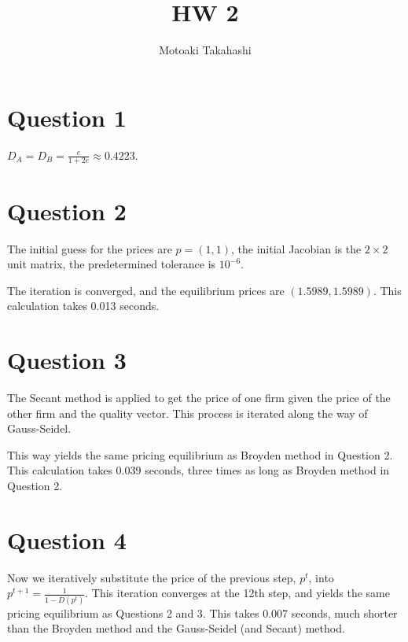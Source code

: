 \documentclass[12pt]{article}
\begin{document}
 
 
\title{HW 2}
\author{Motoaki Takahashi}
\maketitle
\section{Question 1}
$D_{A}=D_{B}=\frac{e}{1+2e}\approx0.4223.$

\section{Question 2}
The initial guess for the prices are $p=(1, 1)$, the initial Jacobian is the $2\times 2$ unit matrix, the predetermined tolerance is $10^{-6}$.\par
The iteration is converged, and the equilibrium prices are $(1.5989, 1.5989)$. This calculation takes 0.013 seconds.


\section{Question 3}
The Secant method is applied to get the price of one firm given the price of the other firm and the quality vector. This process is iterated along the way of Gauss-Seidel. \par
This way yields the same pricing equilibrium as Broyden method in Question 2. This calculation takes 0.039 seconds, three times as long as Broyden method in Question 2.

\section{Question 4}
Now we iteratively substitute the price of the previous step, $p^{t}$, into $p^{t+1}=\frac{1}{1-D(p^{t})}$. This iteration converges at the 12th step, and yields the same pricing equilibrium as Questions 2 and 3. This takes 0.007 seconds, much shorter than the Broyden method and the Gauss-Seidel (and Secant) method.
\end{document}
